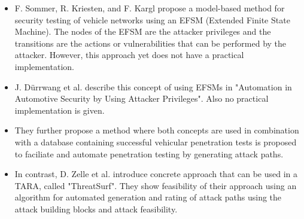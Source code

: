 \begin{itemize}

\item F. Sommer, R. Kriesten, and F. Kargl propose a model-based method for security testing of vehicle networks\cite{model_based_testing} using an EFSM (Extended Finite State Machine). 
The nodes of the EFSM are the attacker privileges and the transitions are the actions or vulnerabilities that can be performed by the attacker.
However, this approach yet does not have a practical implementation.\\

\item J. Dürrwang et al. describe this concept of using EFSMs in "Automation in Automotive Security by Using Attacker Privileges"\cite{attacker_privileges}.
Also no practical implementation is given.\\

\item They further propose a method where both concepts are used in combination with a database containing successful vehicular penetration tests is proposed to faciliate and automate penetration testing by generating attack paths\cite{attack_database}.\\

\item In contrast, D. Zelle et al. introduce concrete approach that can be used in a TARA, called "ThreatSurf"\cite{threat_surf}.
They show feasibility of their approach using an algorithm for automated generation and rating of attack paths using the attack building blocks and attack feasibility.\\

\end{itemize}




